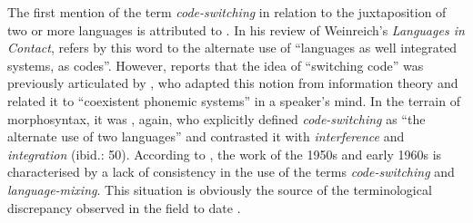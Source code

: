 The first mention of the term \textit {code-switching} in relation to the juxtaposition of two or more languages is attributed to \citet{vogt-rev-1954}. In his review of Weinreich's \textit{Languages in Contact}, \citet[][81]{vogt-rev-1954} refers by this word to the alternate use of ``languages as well integrated systems, as codes''. However, \citet{alvarez-caccamo-switching-1998} reports that the idea of  ``switching code'' was previously articulated by \citet[][11]{jakobson-preliminaries-1976}, who adapted this notion from information theory and related it to ``coexistent phonemic systems'' in a speaker's mind. In the terrain of morphosyntax, it was \citet[][40]{haugen-bilingualism-1956}, again, who explicitly defined \textit{code-switching} as ``the alternate use of two languages'' and contrasted it with \textit{interference} and \textit{integration} (ibid.: 50). According to \citet{alvarez-caccamo-switching-1998}, the work of the 1950s and early 1960s is characterised by a lack of consistency in the use of the terms \textit{code-switching} and \textit{language-mixing}. This situation is obviously the source of the terminological discrepancy observed in the field to date \citep[for overviews, see][]{ammon-code-switching-2004, ammon-code-switching-2005}.

